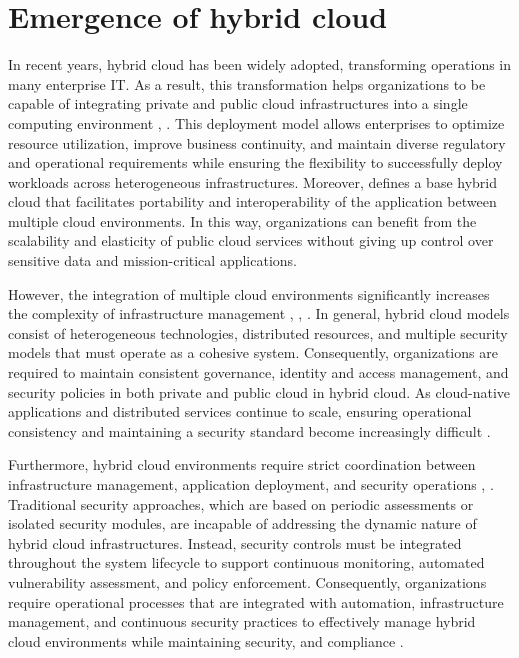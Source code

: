 \section{Emergence of hybrid cloud}
\label{sec:Emergence}

In recent years, hybrid cloud has been widely adopted, transforming operations in many enterprise IT. As a result, this transformation helps organizations to be capable of integrating private and public cloud infrastructures into a single computing environment \cite{Mell2011NIST}, \cite{Liu2011NISTRA}. This deployment model allows enterprises to optimize resource utilization, improve business continuity, and maintain diverse regulatory and operational requirements while ensuring the flexibility to successfully deploy workloads across heterogeneous infrastructures. Moreover, \cite{Liu2011NISTRA} defines a base hybrid cloud that facilitates portability and interoperability of the application between multiple cloud environments. In this way, organizations can benefit from the scalability and elasticity of public cloud services without giving up control over sensitive data and mission-critical applications.

However, the integration of multiple cloud environments significantly increases the complexity of infrastructure management \cite{Armbrust2010Cloud}, \cite{Flexera2025StateCloud}, \cite{Liu2011NISTRA}. In general, hybrid cloud models consist of heterogeneous technologies, distributed resources, and multiple security models that must operate as a cohesive system. Consequently, organizations are required to maintain consistent governance, identity and access management, and security policies in both private and public cloud in hybrid cloud. As cloud-native applications and distributed services continue to scale, ensuring operational consistency and maintaining a security standard become increasingly difficult \cite{HashiCorp2025StateCloud}.

Furthermore, hybrid cloud environments require strict coordination between infrastructure management, application deployment, and security operations \cite{Armbrust2010Cloud}, \cite{HashiCorp2025StateCloud}. Traditional security approaches, which are based on periodic assessments or isolated security modules, are incapable of addressing the dynamic nature of hybrid cloud infrastructures. Instead, security controls must be integrated throughout the system lifecycle to support continuous monitoring, automated vulnerability assessment, and policy enforcement. Consequently, organizations require operational processes that are integrated with automation, infrastructure management, and continuous security practices to effectively manage hybrid cloud environments while maintaining security, and compliance \cite{Flexera2025StateCloud}.
